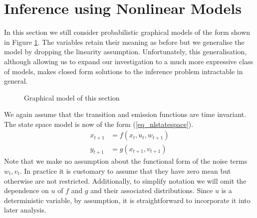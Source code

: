 \section{Inference using Nonlinear Models}
\label{sec_inf_nonlin_mods}
In this section we still consider probabilistic graphical models of the form shown in Figure \ref{fig_nlmod}. The variables retain their meaning as before but we generalise the model by dropping the linearity assumption. Unfortunately, this generalisation, although allowing us to expand our investigation to a much more expressive class of models, makes closed form solutions to the inference problem intractable in general.   
\begin{figure}[H] 
\centering
{}
\caption{Graphical model of this section}
\label{fig_nlmod}
\end{figure}
We again assume that the transition and emission functions are time invariant. The state space model is now of the form (\ref{eq_nlstatespace}).
\begin{equation}
\begin{aligned}
x_{t+1} &= f(x_t, u_t, w_{t+1}) \\
y_{t+1} &= g(x_{t+1}, v_{t+1})
\end{aligned}
\label{eq_nlstatespace}
\end{equation}
Note that we make no assumption about the functional form of the noise terms $w_t,v_t$. In practice it is customary to assume that they have zero mean but otherwise are not restricted. Additionally, to simplify notation we will omit the dependence on $u$ of $f$ and $g$ and their associated distributions. Since $u$ is a deterministic variable, by assumption, it is straightforward to incorporate it into later analysis. 

